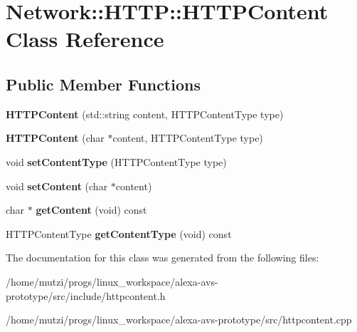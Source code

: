 \hypertarget{classNetwork_1_1HTTP_1_1HTTPContent}{}\section{Network\+:\+:H\+T\+TP\+:\+:H\+T\+T\+P\+Content Class Reference}
\label{classNetwork_1_1HTTP_1_1HTTPContent}
\subsection*{Public Member Functions}
\begin{DoxyCompactItemize}
\item 
\mbox{\label{classNetwork_1_1HTTP_1_1HTTPContent_abe506faf6f1dbe781606101434f0fe7f}} 
{\bfseries H\+T\+T\+P\+Content} (std\+::string content, H\+T\+T\+P\+Content\+Type type)
\item 
\mbox{\label{classNetwork_1_1HTTP_1_1HTTPContent_ab4cde0d1977561cb6eba454829f184c0}} 
{\bfseries H\+T\+T\+P\+Content} (char $\ast$content, H\+T\+T\+P\+Content\+Type type)
\item 
\mbox{\label{classNetwork_1_1HTTP_1_1HTTPContent_a84862338e35fc61282d818529b330966}} 
void {\bfseries set\+Content\+Type} (H\+T\+T\+P\+Content\+Type type)
\item 
\mbox{\label{classNetwork_1_1HTTP_1_1HTTPContent_a1f9f0dfcbfd829edb897eb600db68f45}} 
void {\bfseries set\+Content} (char $\ast$content)
\item 
\mbox{\label{classNetwork_1_1HTTP_1_1HTTPContent_a0e1e4b55b8b5c69b9b1ca63d6459c90c}} 
char $\ast$ {\bfseries get\+Content} (void) const
\item 
\mbox{\label{classNetwork_1_1HTTP_1_1HTTPContent_ac107938b129049aacdc218aff1b61a42}} 
H\+T\+T\+P\+Content\+Type {\bfseries get\+Content\+Type} (void) const
\end{DoxyCompactItemize}


The documentation for this class was generated from the following files\+:\begin{DoxyCompactItemize}
\item 
/home/mutzi/progs/linux\+\_\+workspace/alexa-\/avs-\/prototype/src/include/httpcontent.\+h\item 
/home/mutzi/progs/linux\+\_\+workspace/alexa-\/avs-\/prototype/src/httpcontent.\+cpp\end{DoxyCompactItemize}
